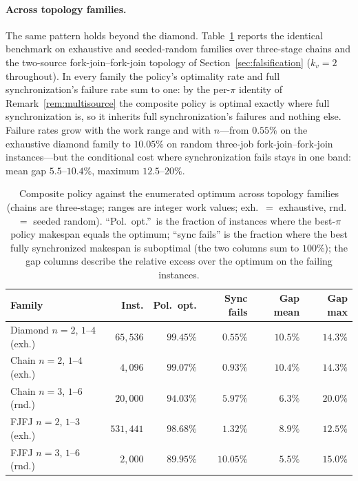 \documentclass[sn-mathphys,NameDate]{sn-jnl}
\theoremstyle{thmstyleone}
\theoremstyle{thmstylethree}
\theoremstyle{thmstyletwo}
\begin{document}
\paragraph{Across topology families.}
The same pattern holds beyond the diamond.
Table~\ref{tab:policy} reports the identical benchmark on
exhaustive and seeded-random families over three-stage chains
and the two-source fork-join--fork-join topology of
Section~\ref{sec:falsification} ($k_v = 2$ throughout). In
every family the policy's optimality rate and full
synchronization's failure rate sum to one: by the per-$\pi$
identity of Remark~\ref{rem:multisource} the composite policy
is optimal exactly where full synchronization is, so it
inherits full synchronization's failures and nothing else.
Failure rates grow with the work range and with $n$---from
$0.55\%$ on the exhaustive diamond family to $10.05\%$ on
random three-job fork-join--fork-join instances---but the
conditional cost where synchronization fails stays in one
band: mean gap $5.5$--$10.4\%$, maximum $12.5$--$20\%$.

\begin{table}[h]
\centering
\caption{Composite policy against the enumerated optimum
across topology families (chains are three-stage; ranges are
integer work values; exh.\ $=$ exhaustive, rnd.\ $=$ seeded
random). ``Pol.\ opt.''\ is the fraction of instances where
the best-$\pi$ policy makespan equals the optimum; ``sync
fails'' is the fraction where the best fully synchronized
makespan is suboptimal (the two columns sum to $100\%$); the
gap columns describe the relative excess over the optimum on
the failing instances.}
\label{tab:policy}
\small
\setlength{\tabcolsep}{4pt}
\begin{tabular}{lrrrrr}
\toprule
\textbf{Family} & \textbf{Inst.} &
\textbf{Pol.\ opt.} & \textbf{Sync fails} &
\textbf{Gap mean} & \textbf{Gap max} \\
\midrule
Diamond $n{=}2$, $1$--$4$ (exh.) & $65{,}536$
  & $99.45\%$ & $0.55\%$ & $10.5\%$ & $14.3\%$ \\
Chain $n{=}2$, $1$--$4$ (exh.) & $4{,}096$
  & $99.07\%$ & $0.93\%$ & $10.4\%$ & $14.3\%$ \\
Chain $n{=}3$, $1$--$6$ (rnd.) & $20{,}000$
  & $94.03\%$ & $5.97\%$ & $6.3\%$ & $20.0\%$ \\
FJFJ $n{=}2$, $1$--$3$ (exh.) & $531{,}441$
  & $98.68\%$ & $1.32\%$ & $8.9\%$ & $12.5\%$ \\
FJFJ $n{=}3$, $1$--$6$ (rnd.) & $2{,}000$
  & $89.95\%$ & $10.05\%$ & $5.5\%$ & $15.0\%$ \\
\bottomrule
\end{tabular}
\end{table}
\end{document}

